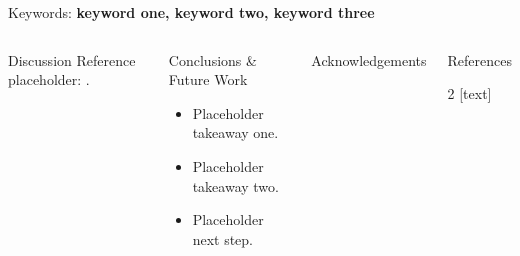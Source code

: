 \documentclass{beamer}
\begin{document}
\begin{frame}[t]{Keywords: \bfseries keyword one, keyword two, keyword three}
\begin{columns}[t]
    \begin{block}{Discussion}
      \lipsum[5][1-5]
      Reference placeholder: \cite{placeholder2020,placeholder2021}.
    \end{block}

    \begin{block}{Conclusions \& Future Work}
      \begin{itemize}
        \item Placeholder takeaway one.
        \item Placeholder takeaway two.
        \item Placeholder next step.
      \end{itemize}
    \end{block}

    \begin{block}{Acknowledgements}
      \lipsum[6][1-3]
    \end{block}

    \begin{block}{References}
      \small
      \begin{multicols}{2}
        [text]
        
        
      \end{multicols}
    \end{block}

  \end{columns}
\end{frame}
\end{document}
